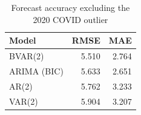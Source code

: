 \begin{table}

\caption{\label{tab:forecast-accuracy-ex-covid}Forecast accuracy excluding the 2020 COVID outlier}
\centering
\begin{tabular}[t]{lrr}
\toprule
Model & RMSE & MAE\\
\midrule
BVAR(2) & 5.510 & 2.764\\
ARIMA (BIC) & 5.633 & 2.651\\
AR(2) & 5.762 & 3.233\\
VAR(2) & 5.904 & 3.207\\
\bottomrule
\end{tabular}
\end{table}
